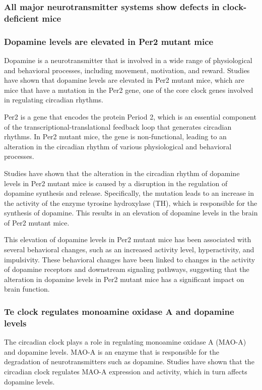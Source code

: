 \begin{itemize}
\begin{itemize}
\subsubsection{All major neurotransmitter systems show defects in clock-deficient mice}

\subsubsection{Dopamine levels are elevated in Per2 mutant mice}
Dopamine is a neurotransmitter that is involved in a wide range of physiological and behavioral processes, including movement, motivation, and reward. Studies have shown that dopamine levels are elevated in Per2 mutant mice, which are mice that have a mutation in the Per2 gene, one of the core clock genes involved in regulating circadian rhythms.

Per2 is a gene that encodes the protein Period 2, which is an essential component of the transcriptional-translational feedback loop that generates circadian rhythms. In Per2 mutant mice, the gene is non-functional, leading to an alteration in the circadian rhythm of various physiological and behavioral processes.

Studies have shown that the alteration in the circadian rhythm of dopamine levels in Per2 mutant mice is caused by a disruption in the regulation of dopamine synthesis and release. Specifically, the mutation leads to an increase in the activity of the enzyme tyrosine hydroxylase (TH), which is responsible for the synthesis of dopamine. This results in an elevation of dopamine levels in the brain of Per2 mutant mice.

This elevation of dopamine levels in Per2 mutant mice has been associated with several behavioral changes, such as an increased activity level, hyperactivity, and impulsivity. These behavioral changes have been linked to changes in the activity of dopamine receptors and downstream signaling pathways, suggesting that the alteration in dopamine levels in Per2 mutant mice has a significant impact on brain function.
\subsubsection{Te clock regulates monoamine oxidase A and dopamine levels}
The circadian clock plays a role in regulating monoamine oxidase A (MAO-A) and dopamine levels. MAO-A is an enzyme that is responsible for the degradation of neurotransmitters such as dopamine. Studies have shown that the circadian clock regulates MAO-A expression and activity, which in turn affects dopamine levels.


\end{itemize}
\end{itemize}
